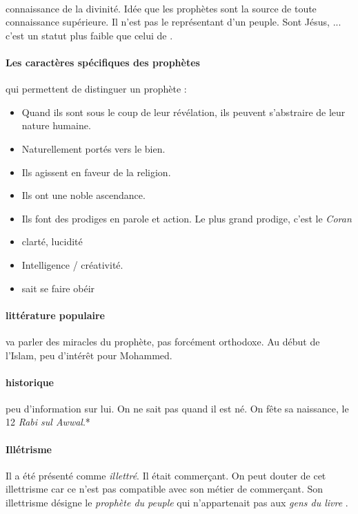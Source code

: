 \paragraph{\Nabi} connaissance de la divinité. Idée que les prophètes sont la source de toute connaissance supérieure. Il n'est pas le représentant d'un peuple. Sont \Nabi Jésus, ... c'est un statut plus faible que celui de \Rasul.

\paragraph{Les caractères spécifiques des prophètes}
qui permettent de distinguer un prophète :
\begin{itemize}
    \item Quand ils sont sous le coup de leur révélation, ils peuvent s'abstraire de leur nature humaine.
    \item Naturellement portés vers le bien.
    \item Ils agissent en faveur de la religion.
    \item Ils ont une noble ascendance.
    \item Ils font des prodiges en parole et action. Le plus grand prodige, c'est le \textit{Coran}
    \item clarté, lucidité
    \item Intelligence / créativité.
    \item sait se faire obéir
    
\end{itemize}




\paragraph{littérature populaire} va parler des miracles du prophète, pas forcément orthodoxe. Au début de l’Islam, peu d’intérêt pour Mohammed.

\paragraph{historique}  peu d’information sur lui. On ne sait pas quand il est né. On fête sa naissance, le 12 \textit{Rabi sul Awwal}.*

\paragraph{Illétrisme}
Il a été présenté comme \textit{illettré}. Il était commerçant. On peut douter de cet illettrisme car ce n'est pas compatible avec son métier de commerçant.
Son illettrisme désigne le \textit{prophète du peuple} qui n'appartenait pas aux \textit{gens du livre}
. 

